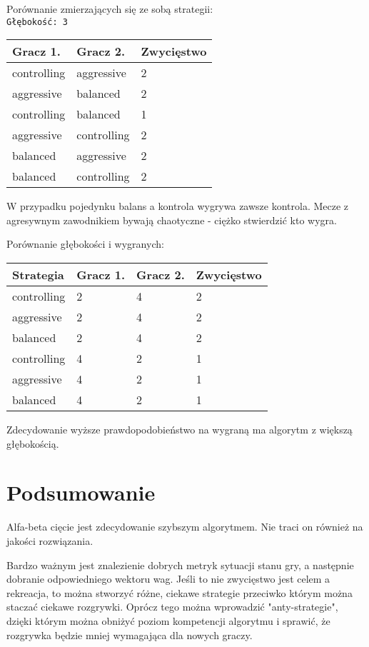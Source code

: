 \documentclass[12pt, a4paper]{article}
\begin{document}
Porównanie zmierzających się ze sobą strategii: \\
\texttt{Głębokość: 3}
\begin{center}
    \begin{tabular}{| m{5em} | m{5em} | m{5em} |}
        \hline
        Gracz 1. & Gracz 2. & Zwycięstwo \\
        \hline
        controlling & aggressive & 2 \\
        \hline
        aggressive & balanced & 2 \\
        \hline
        controlling & balanced & 1 \\
        \hline
        aggressive & controlling & 2 \\
        \hline
        balanced & aggressive & 2 \\
        \hline
        balanced & controlling & 2 \\
        \hline
    \end{tabular}
\end{center}

W przypadku pojedynku balans a kontrola wygrywa zawsze kontrola.
Mecze z agresywnym zawodnikiem bywają chaotyczne - ciężko stwierdzić kto wygra.

Porównanie głębokości i wygranych:
\begin{center}
    \begin{tabular}{| m{5em} | m{5em} | m{5em} | m{5em} |}
        \hline
        Strategia & Gracz 1. & Gracz 2. & Zwycięstwo \\
        \hline
        controlling & 2 & 4 & 2 \\
        \hline
        aggressive & 2 & 4 & 2 \\
        \hline
        balanced & 2 & 4 & 2 \\
        \hline
        controlling & 4 & 2 & 1 \\
        \hline
        aggressive & 4 & 2 & 1 \\
        \hline
        balanced & 4 & 2 & 1 \\
        \hline
    \end{tabular}
\end{center}
Zdecydowanie wyższe prawdopodobieństwo na wygraną ma algorytm z większą głębokością.

\section{Podsumowanie}
Alfa-beta cięcie jest zdecydowanie szybszym algorytmem.
Nie traci on również na jakości rozwiązania.

Bardzo ważnym jest znalezienie dobrych metryk sytuacji stanu gry,
a następnie dobranie odpowiedniego wektoru wag. Jeśli to nie zwycięstwo jest celem a rekreacja,
to można stworzyć różne, ciekawe strategie przeciwko którym można staczać ciekawe rozgrywki.
Oprócz tego można wprowadzić "anty-strategie", dzięki którym można obniżyć poziom kompetencji
algorytmu i sprawić, że rozgrywka będzie mniej wymagająca dla nowych graczy.


\printbibliography
\end{document}
